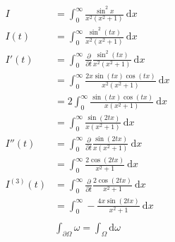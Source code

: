 \documentclass[a4paper,11pt]{article}
\theoremstyle{plain}
\theoremstyle{definition}
\newcommand{\dx}{\text{d}}
\newcommand{\del}{\partial}
\begin{document}
\begin{align*}
	I&=\int_0^\infty \frac{\sin^2 x}{x^2(x^2+1)}\ \dx x\\
	I(t)&=\int_0^\infty \frac{\sin^2 (tx)}{x^2(x^2+1)}\ \dx x\\
	I'(t)
	&=\int_0^\infty\frac{\del}{\del t}\frac{\sin^2(tx)}{x^2(x^2+1)}\ \dx x\\
	&=\int_0^\infty\frac{2x\sin(tx)\cos(tx)}{x^2(x^2+1)}\ \dx x\\
	&=2\int_0^\infty\frac{\sin(tx)\cos(tx)}{x(x^2+1)}\ \dx x\\
	&=\int_0^\infty\frac{\sin(2tx)}{x(x^2+1)}\ \dx x\\
	I''(t)&=\int_0^\infty\frac{\del}{\del t}\frac{\sin(2tx)}{x(x^2+1)}\ \dx x\\
	      &=\int_0^\infty\frac{2\cos(2tx)}{x^2+1}\ \dx x\\
	I^{(3)}(t)&=\int_0^\infty\frac{\del}{\del t}
	\frac{2\cos(2tx)}{x^2+1}\ \dx x\\
	&=\int_0^\infty-\frac{4x\sin(2tx)}{x^2+1}\ \dx x\\
\end{align*}
\begin{align*}
	\int_{\del \Omega} \omega = \int_{\Omega} \dx \omega
\end{align*}
\newpage
\end{document}
